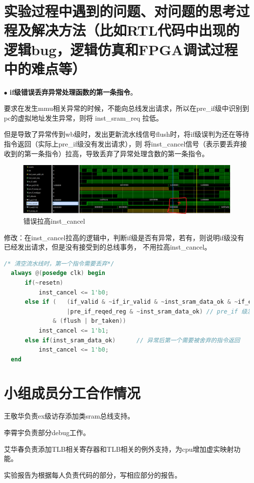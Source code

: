 \documentclass[11pt]{article}
\begin{document}
\section{实验过程中遇到的问题、对问题的思考过程及解决方法（比如RTL代码中出现的逻辑bug，逻辑仿真和FPGA调试过程中的难点等）}

\noindent
$\bullet$
\textbf{if级错误丢弃异常处理函数的第一条指令}。

要求在发生mmu相关异常的时候，不能向总线发出请求，所以在pre\_if级中识别到pc的虚拟地址发生异常，则将 inst\_sram\_req
拉低。

但是导致了异常传到wb级时，发出更新流水线信号flush时，将if级误判为还在等待指令返回（实际上pre\_if级没有发出请求），则
将inst_cancel信号（表示要丢弃接收到的第一条指令）拉高，导致丢弃了异常处理含数的第一条指令。
\begin{figure}[H]
  \centering
  \includegraphics[width=15cm]{fig/fig1.png}
  \caption{错误拉高inst\_cancel}
\end{figure}
修改：在inst\_cancel拉高的逻辑中，判断if级是否有异常，若有，则说明if级没有已经发出请求，但是没有接受到的总线事务，
不用拉高inst\_cancel。
\begin{lstlisting}[language=verilog]
  /* 清空流水线时，第一个指令需要丢弃*/
  always @(posedge clk) begin
      if(~resetn)
          inst_cancel <= 1'b0;
      else if (   (if_valid & ~if_ir_valid & ~inst_sram_data_ok & ~if_excep_en  // if正在等待指令返回， 加入if级是否有异常的判断
                  |pre_if_reqed_reg & ~inst_sram_data_ok) // pre_if 级发出请求，但是数据没有返回，也还没有进入if级
              & (flush | br_taken))
          inst_cancel <= 1'b1;
      else if(inst_sram_data_ok)      // 异常后第一个需要被舍弃的指令返回
          inst_cancel <= 1'b0;
  end
\end{lstlisting}


      
\vspace{1ex}

\section{小组成员分工合作情况}
王敬华负责ex级访存添加类sram总线支持。

李霄宇负责部分debug工作。

艾华春负责添加TLB相关寄存器和TLB相关的例外支持，为cpu增加虚实映射功能。

实验报告为根据每人负责代码的部分，写相应部分的报告。
\end{document}
